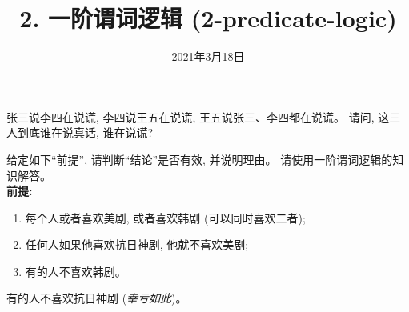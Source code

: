 \documentclass[a4paper, justified]{tufte-handout}
\title{2. 一阶谓词逻辑 (2-predicate-logic)}
\date{2021年3月18日}
\begin{document}
\maketitle
\noplagiarism %
\begin{abstract}
\end{abstract}
\beginrequired

\begin{problem}
  张三说李四在说谎, 李四说王五在说谎, 王五说张三、李四都在说谎。
  请问, 这三人到底谁在说真话, 谁在说谎?
\end{problem}

\begin{solution}
\end{solution}

\begin{problem}
  给定如下``前提'', 请判断``结论''是否有效, 并说明理由。
  请使用一阶谓词逻辑的知识解答。
   \\[10pt]

  {\bf 前提:}
  \begin{enumerate}[(1)]
    \item 每个人或者喜欢美剧, 或者喜欢韩剧 (可以同时喜欢二者);
    \item 任何人如果他喜欢抗日神剧, 他就不喜欢美剧;
    \item 有的人不喜欢韩剧。
  \end{enumerate}

  \vspace{0.20cm}
   有的人不喜欢抗日神剧 ({\it 幸亏如此})。
\end{problem}

\begin{solution}
\end{solution}
\end{document}
